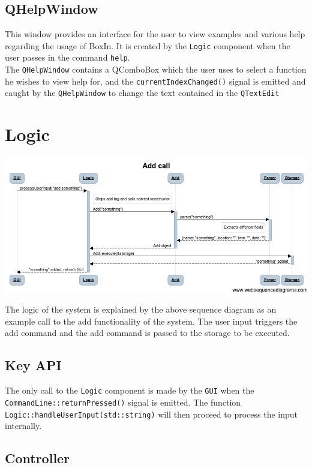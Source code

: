 \documentclass[12pt]{extarticle}
\begin{document}
\subsection{QHelpWindow}
This window provides an interface for the user to view examples and various help regarding the usage of BoxIn. It is created by the \texttt{Logic} component when the user passes in the command \texttt{help}.\\
The \texttt{QHelpWindow} contains a QComboBox which the user uses to select a function he wishes to view help for, and the \texttt{currentIndexChanged()} signal is emitted and caught by the \texttt{QHelpWindow} to change the text contained in the \texttt{QTextEdit}
\newpage

\section{Logic}

\includegraphics[width=\textwidth]{add_call_diagram}

The logic of the system is explained by the above sequence diagram as an example call to the add functionality of the system. The user input triggers the add command and the add command is passed to the storage to be executed.

\subsection{Key API}
The only call to the \texttt{Logic} component is made by the \texttt{GUI} when the \texttt{CommandLine::returnPressed()} signal is emitted. The function \texttt{Logic::handleUserInput(std::string)} will then proceed to process the input internally.

\subsection{Controller}
\end{document}
